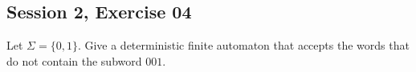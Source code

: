 \subsection{Session 2, Exercise 04}


Let $\Sigma=\{0,1\}$. Give a deterministic finite automaton that accepts the words that do not contain the subword $001$.

